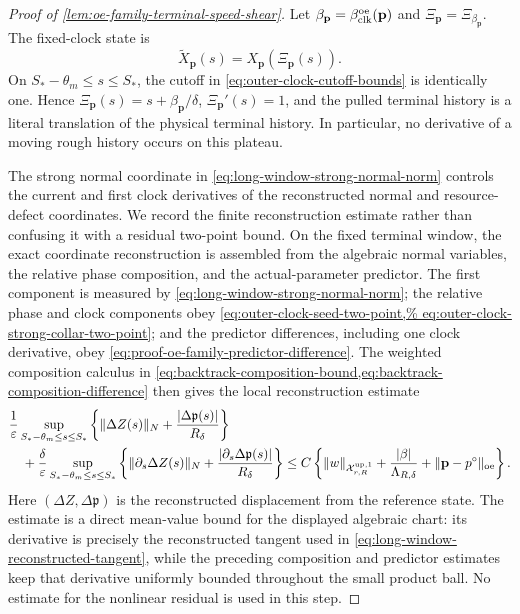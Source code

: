 \begin{proof}[Proof of
\cref{lem:oe-family-terminal-speed-shear}]
Let \(\beta_{\mathbf p}=\beta_{\rm clk}^{\rm oe}(\mathbf p)\) and
\(\Xi_{\mathbf p}=\Xi_{\beta_{\mathbf p}}\).  The fixed-clock state is
\[
 \widetilde X_{\mathbf p}(s)
 =X_{\mathbf p}(\Xi_{\mathbf p}(s)).
\]
On \(S_*-\theta_m\le s\le S_*\), the cutoff in
\cref{eq:outer-clock-cutoff-bounds} is identically one.  Hence
\(\Xi_{\mathbf p}(s)=s+\beta_{\mathbf p}/\delta\),
\(\Xi_{\mathbf p}'(s)=1\), and the pulled terminal history is a literal
translation of the physical terminal history.  In particular, no
derivative of a moving rough history occurs on this plateau.

The strong normal coordinate in
\cref{eq:long-window-strong-normal-norm} controls the current and first
clock derivatives of the reconstructed normal and resource-defect
coordinates.  We record the finite reconstruction estimate rather than
confusing it with a residual two-point bound.  On the fixed terminal
window, the exact coordinate reconstruction is assembled from the
algebraic normal variables, the relative phase composition, and the
actual-parameter predictor.  The first component is measured by
\cref{eq:long-window-strong-normal-norm}; the relative phase and clock
components obey
\cref{eq:outer-clock-seed-two-point,%
eq:outer-clock-strong-collar-two-point}; and the predictor differences,
including one clock derivative, obey
\cref{eq:proof-oe-family-predictor-difference}.  The weighted composition
calculus in
\cref{eq:backtrack-composition-bound,eq:backtrack-composition-difference}
then gives the local reconstruction estimate
\begin{align}
 &\frac1\varepsilon\sup_{S_*-\theta_m\le s\le S_*}
 \left\{\|\Delta Z(s)\|_N+\frac{|\Delta\mathfrak p(s)|}{R_\delta}\right\}
 \notag\\
 &\quad+\frac\delta\varepsilon
 \sup_{S_*-\theta_m\le s\le S_*}
 \left\{\|\partial_s\Delta Z(s)\|_N
       +\frac{|\partial_s\Delta\mathfrak p(s)|}{R_\delta}\right\}
 \le C\left\{\|w\|_{\mathcal X_{r,R}^{\rm up,1}}
       +\frac{|\beta|}{\Lambda_{R,\delta}}
       +\|\mathbf p-p^\circ\|_{\rm oe}\right\}.
                                                        \label{eq:proof-oe-family-terminal-reconstruction-map}
\end{align}
Here \((\Delta Z,\Delta\mathfrak p)\) is the reconstructed displacement
from the reference state.  The estimate is a direct mean-value bound for
the displayed algebraic chart: its derivative is precisely the
reconstructed tangent used in
\cref{eq:long-window-reconstructed-tangent}, while the preceding
composition and predictor estimates keep that derivative uniformly
bounded throughout the small product ball.  No estimate for the nonlinear
residual is used in this step.


\end{proof}
